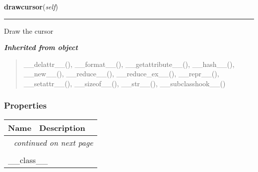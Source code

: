     \label{pygame-asteroids:virtual_keyboard:TextInput:drawcursor}

    \vspace{0.5ex}

\hspace{.8\funcindent}\begin{boxedminipage}{\funcwidth}

    \raggedright \textbf{drawcursor}(\textit{self})

    \vspace{-1.5ex}

    \rule{\textwidth}{0.5\fboxrule}
\setlength{\parskip}{2ex}
    Draw the cursor

\setlength{\parskip}{1ex}
    \end{boxedminipage}


\large{\textbf{\textit{Inherited from object}}}

\begin{quote}
\_\_delattr\_\_(), \_\_format\_\_(), \_\_getattribute\_\_(), \_\_hash\_\_(), \_\_new\_\_(), \_\_reduce\_\_(), \_\_reduce\_ex\_\_(), \_\_repr\_\_(), \_\_setattr\_\_(), \_\_sizeof\_\_(), \_\_str\_\_(), \_\_subclasshook\_\_()
\end{quote}


  \subsubsection{Properties}

    \vspace{-1cm}
\hspace{\varindent}\begin{longtable}{|p{\varnamewidth}|p{\vardescrwidth}|l}
\cline{1-2}
\cline{1-2} \centering \textbf{Name} & \centering \textbf{Description}& \\
\cline{1-2}
\endhead\cline{1-2}\multicolumn{3}{r}{\small\textit{continued on next page}}\\\endfoot\cline{1-2}
\endlastfoot\multicolumn{2}{|l|}{\textit{Inherited from object}}\\
\multicolumn{2}{|p{\varwidth}|}{\raggedright \_\_class\_\_}\\
\cline{1-2}
\end{longtable}

